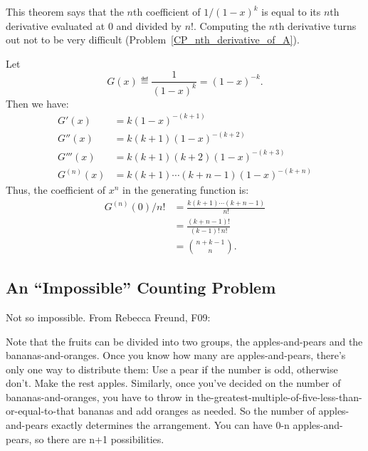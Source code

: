 This theorem says that the $n$th coefficient of $1 / (1 - x)^k$ is
equal to its $n$th derivative evaluated at 0 and divided by $n!$.
Computing the $n$th derivative turns out not to be very difficult
(Problem~\ref{CP_nth_derivative_of_A}).
\begin{editingnotes}

Let
%
\[
G(x) \eqdef \frac{1}{(1-x)^k} = (1-x)^{-k}.
\]
%
Then we have:
%
\begin{align*}
G'(x) & = k (1-x)^{-(k+1)} \\
G''(x) & = k (k+1) (1-x)^{-(k+2)} \\
G'''(x) & = k (k+1) (k+2) (1-x)^{-(k+3)} \\
G^{(n)}(x) & = k (k+1) \cdots (k + n - 1)(1-x)^{-(k+n)}
\end{align*}
%
Thus, the coefficient of $x^n$ in the generating function is:
%
\begin{align*}
G^{(n)}(0) / n! & = \frac{k (k+1) \cdots (k + n - 1)}{n!} \\
                & = \frac{(k + n - 1)!}{(k - 1)! \ n!} \\
                & = \binom{n + k - 1}{n}.
\end{align*}

\end{editingnotes}

\begin{problems}
\practiceproblems
{}

\classproblems
{}

\homeworkproblems
{}

\end{problems}

\examproblems
{}

\subsection{An ``Impossible'' Counting Problem}

\begin{editingnotes}
Not so impossible.  From Rebecca Freund, F09:

Note that the fruits can be divided into two groups, the apples-and-pears
and the bananas-and-oranges. Once you know how many are apples-and-pears,
there's only one way to distribute them: Use a pear if the number is odd,
otherwise don't. Make the rest apples. Similarly, once you've decided on
the number of bananas-and-oranges, you have to throw in
the-greatest-multiple-of-five-less-than-or-equal-to-that bananas and add
oranges as needed. So the number of apples-and-pears exactly determines
the arrangement. You can have 0-n apples-and-pears, so there are n+1
possibilities.
\end{editingnotes}

